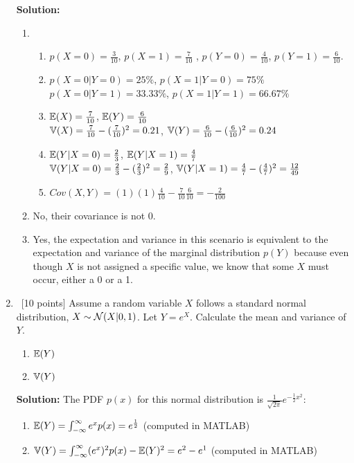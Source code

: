 \documentclass[12pt, fullpage,letterpaper]{article}
\begin{document}
\begin{enumerate}
\textbf{Solution:}
\begin{enumerate}
\item 
	\begin{enumerate}
		\item $p(X = 0) = \frac{3}{10}$, $p(X=1) = \frac{7}{10}$ , $p(Y=0) = \frac{4}{10}$, $p(Y=1) = \frac{6}{10}$.
		\item $p(X = 0 | Y = 0) = 25\%$, $p(X = 1 | Y = 0) = 75\%$ \\$p(X = 0 | Y = 1) = 33.33\%$, $p(X = 1 | Y = 1) = 66.67\%$
		\item $\mathbb{E}(X) = \frac{7}{10}$, $\mathbb{E}(Y) = \frac{6}{10}$ \\ 
		$\mathbb{V}(X) = \frac{7}{10} - (\frac{7}{10})^2 = 0.21$, $\mathbb{V}(Y) = \frac{6}{10} - (\frac{6}{10})^2 = 0.24$
		\item $\mathbb{E}(Y | X = 0) = \frac{2}{3}$, $\mathbb{E}(Y | X = 1) = \frac{4}{7}$ \\ 
		$\mathbb{V}(Y | X = 0) = \frac{2}{3} - (\frac{2}{3})^2 = \frac{2}{9}$, $\mathbb{V}(Y | X = 1) = \frac{4}{7} - (\frac{4}{7})^2 = \frac{12}{49}$
		\item $Cov(X, Y) = (1)(1)\frac{4}{10} - \frac{7}{10}\frac{6}{10} = -\frac{2}{100}$
	\end{enumerate}
	\item No, their covariance is not 0.
	\item Yes, the expectation and variance in this scenario is equivalent to the expectation and variance of the marginal distribution $p(Y)$ because even though $X$ is not assigned a specific value, we know that some $X$ must occur, either a 0 or a 1.
\end{enumerate}
        
\item~[10 points] Assume a random variable $X$ follows a standard normal distribution, \ie $X \sim \mathcal{N}(X|0, 1)$. Let $Y = e^X$. Calculate the mean and variance of $Y$.
\begin{enumerate}
	\item $\mathbb{E}(Y)$
	\item $\mathbb{V}(Y)$
\end{enumerate}

\textbf{Solution:} The PDF $p(x)$ for this normal distribution is $\frac{1}{\sqrt{2\pi}}e^{-\frac{1}{2}x^2}$:
\begin{enumerate}
	\item $\mathbb{E}(Y) = \int_{-\infty}^{\infty} e^x p(x) = e^{\frac{1}{2}}$ (computed in MATLAB)
	\item $\mathbb{V}(Y) = \int_{-\infty}^{\infty} (e^{x})^2 p(x) - \mathbb{E}(Y)^2= e^2 - e^1$ (computed in MATLAB)
\end{enumerate}


\end{enumerate}
\end{document}
